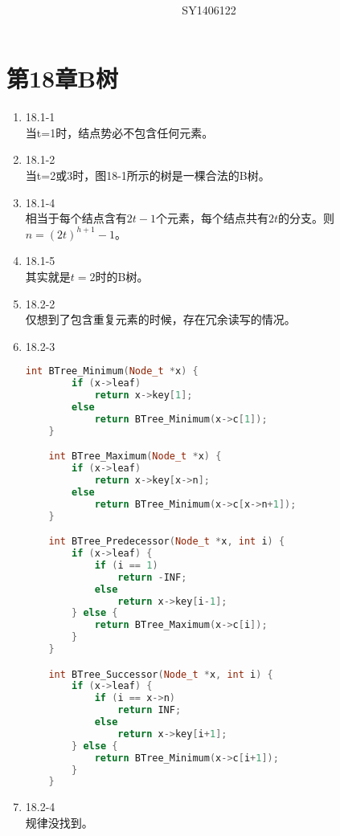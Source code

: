 \documentclass[UTF8]{ctexart}
\begin{document}
\title{\\}
\vspace{2cm}
\author{\\SY1406122}
\date{}
\maketitle

\section*{第18章\quad B树}
\begin{enumerate}
    \item 18.1-1 \\
	当t=1时，结点势必不包含任何元素。
	
	\item 18.1-2 \\
	当t=2或3时，图18-1所示的树是一棵合法的B树。
	
	\item 18.1-4 \\
	相当于每个结点含有$2t-1$个元素，每个结点共有$2t$的分支。则
	$n = (2t)^{h+1}-1$。
	
	\item 18.1-5 \\
	其实就是$t=2$时的B树。
	
	\item 18.2-2 \\
	仅想到了包含重复元素的时候，存在冗余读写的情况。
	
	\item 18.2-3 \\
	\begin{lstlisting}[language=c++]
	int BTree_Minimum(Node_t *x) {
		if (x->leaf)
			return x->key[1];
		else
			return BTree_Minimum(x->c[1]);
	}

	int BTree_Maximum(Node_t *x) {
		if (x->leaf)
			return x->key[x->n];
		else
			return BTree_Minimum(x->c[x->n+1]);
	}

	int BTree_Predecessor(Node_t *x, int i) {
		if (x->leaf) {
			if (i == 1)
				return -INF;
			else
				return x->key[i-1];
		} else {
			return BTree_Maximum(x->c[i]);
		}
	}

	int BTree_Successor(Node_t *x, int i) {
		if (x->leaf) {
			if (i == x->n)
				return INF;
			else
				return x->key[i+1];
		} else {
			return BTree_Minimum(x->c[i+1]);
		}
	}
	\end{lstlisting}
	
	\item 18.2-4 \\
	规律没找到。
	

\end{enumerate}
\end{document}
